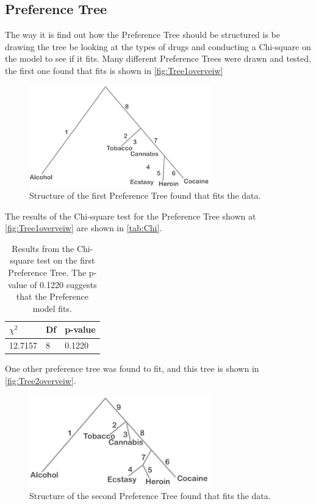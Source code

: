 \subsection*{Preference Tree}
The way it is find out how the Preference Tree should be structured is be drawing the tree be looking at the types of drugs and conducting a Chi-square on the model to see if it fits. Many different Preference Trees were drawn and tested, the first one found that fits is shown in \autoref{fig:Tree1overveiw}
%
\begin{figure}[H]
\centering
\includegraphics[width = 0.70\textwidth]{Figure/Tree1overview}
\caption{Structure of the first Preference Tree found that fits the data.}
\label{fig:Tree1overveiw}
\end{figure}
\noindent
%
The results of the Chi-square test for the Preference Tree shown at \autoref{fig:Tree1overveiw} are shown in \autoref{tab:Chi}. 
%
\begin{table}[H]
\centering
\begin{tabular}{@{}lll@{}}
\toprule
$\chi^{2}$   & Df  & p-value \\ \midrule
12.7157      & 8   & 0.1220  \\ \bottomrule
\end{tabular}
\caption{Results from the Chi-square test on the first Preference Tree. The p-value of 0.1220 suggests that the Preference model fits.}
\label{tab:Chi1}
\end{table} 
\noindent
%
One other preference tree was found to fit, and this tree is shown in \autoref{fig:Tree2overveiw}. 
%
\begin{figure}[H]
\centering
\includegraphics[width = 0.70\textwidth]{Figure/Tree2overview}
\caption{Structure of the second Preference Tree found that fits the data.}
\label{fig:Tree2overveiw}
\end{figure}
